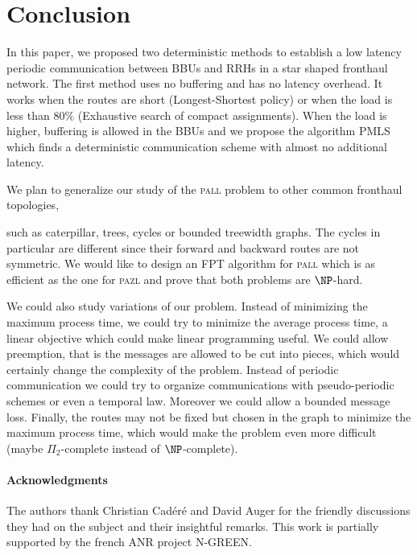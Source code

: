 \documentclass[10pt, conference, letterpaper]{IEEEtran}
\newcommand\pazl{\textsc{pazl}\xspace}
\newcommand\pall{\textsc{pall}\xspace}
\begin{document}
 \section{Conclusion}
In this paper, we proposed two deterministic methods to establish a low latency periodic communication between BBUs and RRHs in 
a star shaped fronthaul network. The first method uses no buffering and has no latency overhead. It works when the routes are short (Longest-Shortest policy) or when the load is less than $80\%$ (Exhaustive search of compact assignments).  
When the load is higher, buffering is allowed in the BBUs and we propose the algorithm PMLS which  finds a deterministic communication scheme with almost no additional latency.
% 

   
   We plan to generalize our study of the \pall problem to other common fronthaul topologies,

   such as caterpillar, trees, cycles or bounded treewidth graphs. The cycles in particular are 
   different since their forward and backward routes are not symmetric. 
   We would like to design an FPT algorithm for \pall which is as efficient as the one for \pazl 
   and prove that both problems are $\NP$-hard.

   We could also study variations of our problem. Instead of minimizing the maximum process time, we could try to minimize the average process time, a linear objective which could make linear programming useful. We could allow preemption, that is the messages are allowed to be cut into pieces, which would certainly change the complexity of the problem.  Instead of periodic communication we could try to organize communications with pseudo-periodic schemes or even a temporal law. Moreover we could allow a bounded message loss.
   Finally, the routes may not be fixed but chosen in the graph to minimize the maximum process time, which would make the problem even more difficult (maybe $\Pi_2$-complete instead of $\NP$-complete). 

 \paragraph*{Acknowledgments} The authors thank Christian Cad\'er\'e and David Auger for the friendly discussions
 they had on the subject and their insightful remarks. This work is partially supported by the french ANR project N-GREEN.



\end{document}
